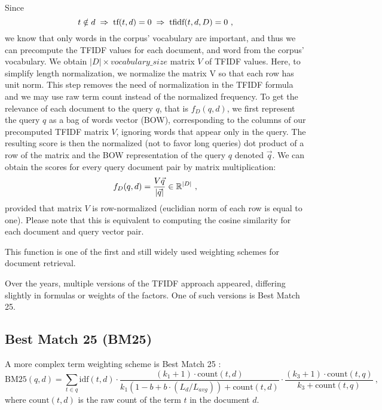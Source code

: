 Since %
$$t\notin d \hspace{1mm}\Rightarrow\hspace{1mm} \text{tf}(t, d) = 0 \hspace{1mm}\Rightarrow\hspace{1mm} \text{tfidf}(t, d, D) = 0\ ,$$
we know that only words in the corpus' vocabulary are important, and thus we can precompute the TFIDF values for each document, and word from the corpus' vocabulary.
We obtain $|D|\times {vocabulary\_size}$ matrix $V$ of TFIDF values.
Here, to simplify length normalization, we normalize the matrix V so that each row has unit norm.
This step removes the need of normalization in the TFIDF formula and we may use raw term count instead of the normalized frequency.
To get the relevance of each document to the query $q$, that is $f_D(q, d)$, we first represent the query $q$ as a bag of words vector (BOW), corresponding to the columns of our precomputed TFIDF matrix $V$, ignoring words that appear only in the query.
The resulting score is then the normalized (not to favor long queries) dot product of a row of the matrix and the BOW representation of the query $q$ denoted $\vec{q}$.
We can obtain the scores for every query document pair by matrix multiplication:
$$
f_D(q, d) = \frac{V\vec{q}}{|\vec{q}|} \in \mathbb{R}^{|D|}\ ,
$$
provided that matrix $V$ is row-normalized (euclidian norm of each row is equal to one).
Please note that this is equivalent to computing the cosine similarity for each document and query vector pair.

This function is one of the first and still widely used \citep{Beel2016} weighting schemes for document retrieval. 

Over the years, multiple versions of the TFIDF approach appeared, differing slightly in formulas or weights of the factors. One of such versions is Best Match 25. %

\subsection{Best Match 25 (BM25)}

A more complex term weighting scheme is Best Match 25 \citep{bm25}:
$$
\text{BM25}(q, d) = 
        \sum_{t\in q}
        \text{idf}(t, d)
        \cdot \frac{(k_1 + 1)\cdot\text{count}(t, d)}{k_1(1-b + b \cdot (L_d / L_{avg})) + \text{count}(t, d)} 
        \cdot \frac{(k_3 + 1)\cdot\text{count}(t, q)}{k_3 + \text{count}(t, q)}
\ ,
$$
where $\text{count}(t,d)$ is the raw count of the term $t$ in the document $d$.

